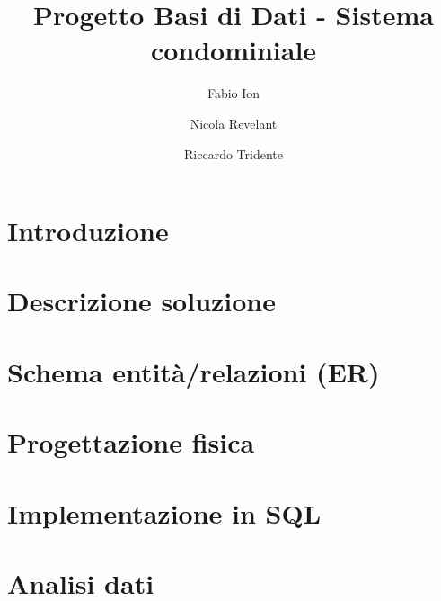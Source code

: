 \documentclass[11pt]{article}
\title{Progetto Basi di Dati - Sistema condominiale}
\author{
	Fabio Ion
	\and
	Nicola Revelant
	\and
	Riccardo Tridente
}
\begin{document}
\maketitle

\tableofcontents

\clearpage

\section{Introduzione}

\clearpage

\section{Descrizione soluzione}

\section{Schema entità/relazioni (ER)}





\section{Progettazione fisica}

\section{Implementazione in SQL}

\section{Analisi dati}
\end{document}
